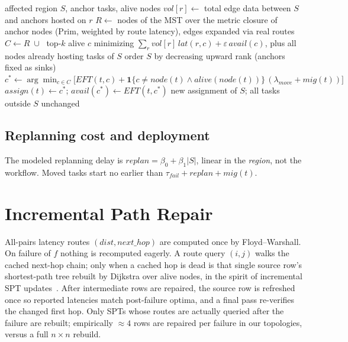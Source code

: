 \documentclass[conference]{IEEEtran}
\theoremstyle{remark}
\begin{document}
\begin{algorithm}
\caption{Anchor-aware partial repartitioning}
\label{alg:repartition}
\begin{algorithmic}[1]
\REQUIRE affected region $S$, anchor tasks, alive nodes
\STATE $vol[r] \gets$ total edge data between $S$ and anchors hosted on $r$
\STATE $R \gets$ nodes of the MST over the metric closure of anchor nodes
       (Prim, weighted by route latency), edges expanded via real routes
\STATE $C \gets R \;\cup\;$ top-$k$ alive $c$ minimizing
       $\sum_r vol[r]\,\mathit{lat}(r,c) + \varepsilon\,\mathit{avail}(c)$,
       plus all nodes already hosting tasks of $S$
\STATE order $S$ by decreasing upward rank (anchors fixed as sinks)
  \STATE $c^* \gets \arg\min_{c \in C}\big[\mathit{EFT}(t,c) +
         \mathbf{1}\{c \neq \mathit{node}(t) \wedge
         \mathit{alive}(\mathit{node}(t))\}\,
         (\lambda_{move} + \mathit{mig}(t))\big]$
  \STATE $\mathit{assign}(t) \gets c^*$;\quad
         $\mathit{avail}(c^*) \gets \mathit{EFT}(t,c^*)$
\ENDFOR
\RETURN new assignment of $S$; all tasks outside $S$ unchanged
\end{algorithmic}
\end{algorithm}

\subsection{Replanning cost and deployment}

The modeled replanning delay is
$\mathit{replan} = \beta_0 + \beta_1 |S|$, linear in the \emph{region}, not
the workflow. Moved tasks start no earlier than
$\tau_{fail} + \mathit{replan} + \mathit{mig}(t)$.

\section{Incremental Path Repair}
\label{sec:paths}

All-pairs latency routes $(\mathit{dist}, \mathit{next\_hop})$ are computed
once by Floyd--Warshall. On failure of $f$ nothing is recomputed eagerly.
A route query $(i,j)$ walks the cached next-hop chain; only when a cached hop
is dead is that single source row's shortest-path tree rebuilt by Dijkstra
over alive nodes, in the spirit of incremental SPT
updates~\cite{bhowmick2019}. After intermediate rows are repaired, the source
row is refreshed once so reported latencies match post-failure optima, and a
final pass re-verifies the changed first hop. Only SPTs whose routes are
actually queried after the failure are rebuilt; empirically $\approx 4$ rows
are repaired per failure in our topologies, versus a full $n\times n$
rebuild.
\end{document}
